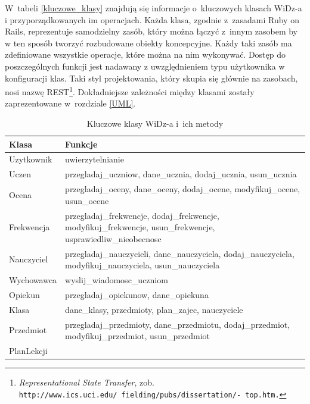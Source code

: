 \documentclass[12pt,leqno,twoside]{mwart}
\begin{document}
\indent W~tabeli \ref{kluczowe_klasy} znajdują się informacje o~kluczowych klasach WiDz-a i przyporządkowanych im operacjach. Każda klasa, zgodnie z~zasadami Ruby on Rails, reprezentuje samodzielny zasób, który można łączyć z~innym zasobem by w ten sposób tworzyć rozbudowane obiekty koncepcyjne. Każdy taki zasób ma zdefiniowane wszystkie operacje, które można na nim wykonywać. Dostęp do poszczególnych funkcji jest nadawany z uwzględnieniem typu użytkownika w konfiguracji klas. Taki styl projektowania, który skupia się głównie na zasobach, nosi nazwę REST\footnote{\textit{Representational State Transfer}, zob. \tt{http://www.ics.uci.edu/~fielding/pubs/dissertation/}\rm{-} \tt{top.htm}.}. Dokładniejsze zależności między klasami zostały zaprezentowane w~rozdziale \ref{UML}.
\begin{table}[h]
	\centering
	\caption{Kluczowe klasy WiDz-a i~ich metody}
		\rule{0pt}{3ex}
		\begin{tabular}{|l|p{12cm}|}
		\hline
		\textbf{Klasa} & \textbf{Funkcje} \\ \hline
		Uzytkownik & uwierzytelnianie \\ \hline
		Uczen & 
			\parbox[t]{12cm}{
			\raggedright
				przegladaj\_uczniow, dane\_ucznia, dodaj\_ucznia, usun\_ucznia
			}\\ \hline
		Ocena & 
			\parbox[t]{12cm}{
			\raggedright
				przegladaj\_oceny, dane\_oceny, dodaj\_ocene, modyfikuj\_ocene, usun\_ocene
			} \\ \hline
		Frekwencja &
			\parbox[t]{12cm}{
			\raggedright			
				przegladaj\_frekwencje, dodaj\_frekwencje, modyfikuj\_frekwencje, usun\_frekwencje, usprawiedliw\_nieobecnosc
			}\\ \hline
		Nauczyciel &
			\parbox[t]{12cm}{
			\raggedright			
				przegladaj\_nauczycieli, dane\_nauczyciela, dodaj\_nauczyciela, modyfikuj\_nauczyciela, usun\_nauczyciela
			} \\ \hline
		Wychowawca & wyslij\_wiadomosc\_uczniom \\ \hline
		Opiekun & przegladaj\_opiekunow, dane\_opiekuna \\ \hline
		Klasa & dane\_klasy, przedmioty, plan\_zajec, nauczyciele \\ \hline
		Przedmiot &
			\parbox[t]{12cm}{
			\raggedright			
				przegladaj\_przedmioty, dane\_przedmiotu, dodaj\_przedmiot, modyfikuj\_przedmiot, usun\_przedmiot 
			}\\ \hline
		PlanLekcji &
			\parbox[t]{12cm}{
			\raggedright			
}
\end{tabular}
\end{table}
\end{document}
